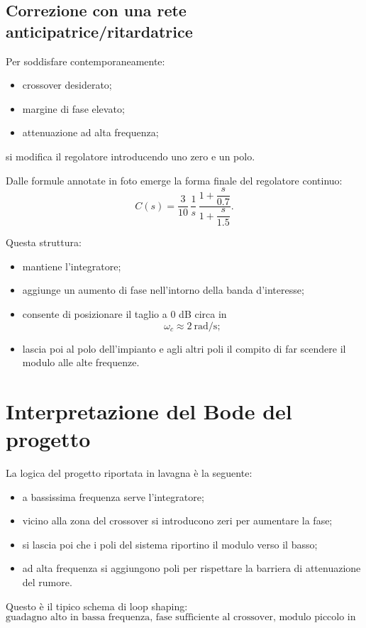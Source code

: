 \subsection{Correzione con una rete anticipatrice/ritardatrice}

Per soddisfare contemporaneamente:
\begin{itemize}
    \item crossover desiderato;
    \item margine di fase elevato;
    \item attenuazione ad alta frequenza;
\end{itemize}
si modifica il regolatore introducendo uno zero e un polo.

Dalle formule annotate in foto emerge la forma finale del regolatore continuo:
\[
C(s)=\frac{3}{10}\,\frac{1}{s}\,
\frac{1+\dfrac{s}{0.7}}{1+\dfrac{s}{1.5}}.
\]

Questa struttura:
\begin{itemize}
    \item mantiene l'integratore;
    \item aggiunge un aumento di fase nell'intorno della banda d'interesse;
    \item consente di posizionare il taglio a \(0\) dB circa in
    \[
    \omega_c \approx 2\ \text{rad/s};
    \]
    \item lascia poi al polo dell'impianto e agli altri poli il compito di far scendere il modulo alle alte frequenze.
\end{itemize}

\section{Interpretazione del Bode del progetto}

La logica del progetto riportata in lavagna \`e la seguente:
\begin{itemize}
    \item a bassissima frequenza serve l'integratore;
    \item vicino alla zona del crossover si introducono zeri per aumentare la fase;
    \item si lascia poi che i poli del sistema riportino il modulo verso il basso;
    \item ad alta frequenza si aggiungono poli per rispettare la barriera di attenuazione del rumore.
\end{itemize}

Questo \`e il tipico schema di loop shaping:
\[
\text{guadagno alto in bassa frequenza, fase sufficiente al crossover, modulo piccolo in alta frequenza.}
\]


